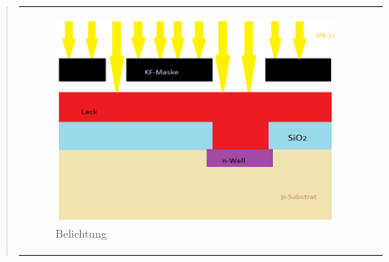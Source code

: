 \begin{quote}
\begin{center}
\begin{tabular}{ll}
\begin{minipage}{0.8\textwidth}
                    \end{minipage}
                    \begin{minipage}{0.4\textwidth}

                        \begin{figure}[H]
                        \hspace{-3em}
                            \includegraphics[scale=0.9, trim = 0cm 0cm 0cm
                            0cm, clip]
                            {./HerstellungBilder/DerMomentderBelichtung.png}
                            \caption{Belichtung}
                           \label{fig:belichtung2}
                        \end{figure}
                    \vspace{-1.5em}

                    \end{minipage}

                \end{tabular}
			\end{center}

    		\vspace{2em}


\end{quote}
